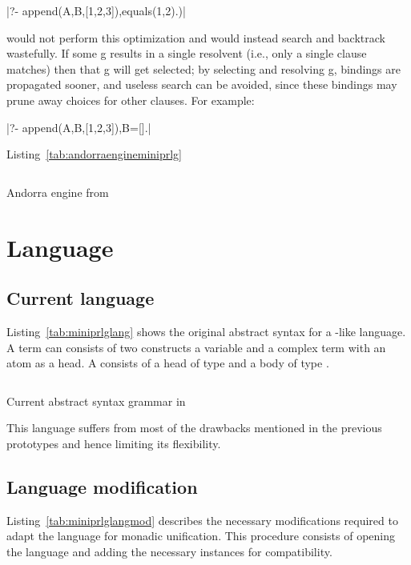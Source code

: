 \documentclass[thesis-solanki.tex]{files}
\begin{document}
|?- append(A,B,[1,2,3]),equals(1,2).)|

 would not perform this optimization and would instead search
and backtrack wastefully.  If some g results in a single resolvent
(i.e., only a single clause matches) then that g will get selected;
by selecting and resolving g, bindings are propagated sooner, and useless
search can be avoided, since these bindings may prune away choices for
other clauses.  For example: 

|?- append(A,B,[1,2,3]),B=[].|

Listing~\ref{tab:andorraengineminiprlg}

\begin{code-list}[H]
\begin{singlespace}
\inputminted[linenos, firstline=29, lastline=64]{haskell}{haskell-proto3-diatomic-unbank.hs}
\end{singlespace}
\caption{Andorra engine from \cite{website:mini-prolog-hugs98}}
\label{tab:andorraengineminiprlg}
\end{code-list}


\section{Language}
\subsection{Current language}
Listing~\ref{tab:miniprlglang} shows the original abstract syntax for a -like language.
A  term can consists of two constructs a variable and a complex term with an atom as a head. A  consists 
of a head of type and a body of type \haskellConstruct{[Term]}. 

\begin{code-list}[H]
\begin{singlespace}
  \inputminted[linenos, firstline=24, lastline=37]{haskell}{haskell-proto3-butter-chicken.hs}
\end{singlespace}
\caption{Current abstract syntax grammar in \cite{website:mini-prolog-hugs98}}
\label{tab:miniprlglang}
\end{code-list}

This language suffers from most of the drawbacks mentioned in the previous prototypes and hence limiting its flexibility.

\subsection{Language modification}
Listing~\ref{tab:miniprlglangmod} describes the necessary modifications required to adapt the language for monadic unification.
This procedure consists of opening the language and adding the necessary instances for  \cite{unification-fd-lib}
compatibility.
\end{document}
